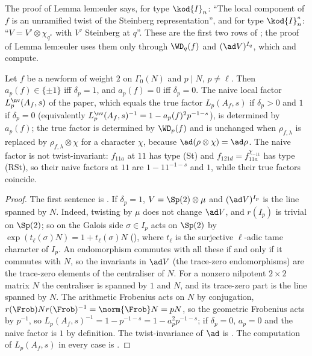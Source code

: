 \begin{paperlink}
The proof of Lemma lem:euler says, for type $\kod{I}_n$: ``The local component of $f$ is an unramified twist of the Steinberg representation'', and
for type $\kod{I}_n^*$: ``$V=V'\otimes\chi_{q^*}$ with $V'$ Steinberg at $q$''. These are the first two rows of ; the
proof of Lemma lem:euler uses them only through $\WD_q(f)$ and $(\ad V)^{I_q}$, which  and  compute.
\end{paperlink}

\begin{corollary}\label{cor:modgalrep:delta-naive}
Let $f$ be a newform of weight $2$ on $\Gamma_0(N)$ and $p\mid N$, $p\ne\ell$. Then $a_p(f)\in\{\pm1\}$ iff $\delta_p=1$, and $a_p(f)=0$ iff $\delta_p=0$. The naive local factor
$L_p^{\nv}(A_f,s)$ of the paper, which equals the true factor $L_p(A_f,s)$ if $\delta_p>0$ and $1$ if $\delta_p=0$ (equivalently $L_p^{\nv}(A_f,s)^{-1}=1-a_p(f)^2p^{-1-s}$), is
determined by $a_p(f)$; the true factor is determined by $\WD_p(f)$ and is unchanged when $\rho_{f,\lambda}$ is replaced by $\rho_{f,\lambda}\otimes\chi$ for a character $\chi$,
because $\ad(\rho\otimes\chi)=\ad\rho$. The naive factor is not twist-invariant: $f_{11a}$ at $11$ has type (St) and $f_{121d}=f_{11a}^{\chi_{-11}}$ has type (RSt), so
their naive factors at $11$ are $1-11^{-1-s}$ and $1$, while their true factors coincide.
\end{corollary}

\begin{proof}
The first sentence is . If $\delta_p=1$, $V=\Sp(2)\otimes\mu$ and $(\ad V)^{I_p}$ is the line spanned by $N$. Indeed, twisting by $\mu$ does not change
$\ad V$, and $r(I_p)$ is trivial on $\Sp(2)$; so on the Galois side $\sigma\in I_p$ acts on $\Sp(2)$ by $\exp(t_\ell(\sigma)N)=1+t_\ell(\sigma)N$ (), where $t_\ell$ is the surjective $\ell$-adic tame character of $I_p$.
An endomorphism commutes with all these if and only if it commutes with $N$, so the invariants in $\ad V$ (the trace-zero endomorphisms) are the trace-zero elements of the
centraliser of $N$. For a nonzero nilpotent $2\times2$ matrix $N$ the centraliser is spanned by $1$ and $N$, and its trace-zero part is the line spanned by $N$. The arithmetic Frobenius acts on $N$ by conjugation, $r(\Frob)Nr(\Frob)^{-1}=\norm{\Frob}N=pN$, so the geometric Frobenius acts by
$p^{-1}$, so $L_p(A_f,s)^{-1}=1-p^{-1-s}=1-a_p^2p^{-1-s}$; if $\delta_p=0$, $a_p=0$ and the naive factor is $1$ by definition. The
twist-invariance of $\ad$ is . The computation of $L_p(A_f,s)$ in every case is .
\end{proof}

